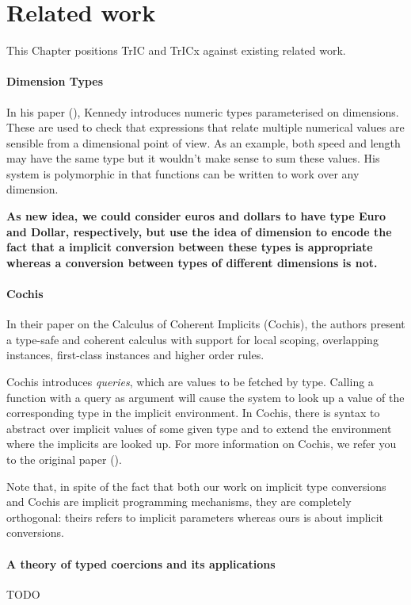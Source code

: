\chapter{Related work}
\label{cha:8}
This Chapter positions TrIC and TrICx against existing related work.
\subsubsection{Dimension Types}
In his paper (\cite{kennedy}), Kennedy introduces numeric types parameterised on dimensions. These are used to check that expressions that relate multiple numerical values are sensible from a dimensional point of view. As an example, both speed and length may have the same type but it wouldn't make sense to sum these values. His system is polymorphic in that functions can be written to work over any dimension.

\textbf{As new idea, we could consider euros and dollars to have type Euro and Dollar, respectively, but use the idea of dimension to encode the fact that a implicit conversion between these types is appropriate whereas a conversion between types of different dimensions is not.}
\subsubsection{Cochis}
In their paper on the Calculus of Coherent Implicits (Cochis), the authors present a type-safe and coherent calculus with support for local scoping, overlapping instances, first-class instances and higher order rules.

Cochis introduces \textit{queries}, which are values to be fetched by type. Calling a function with a query as argument will cause the system to look up a value of the corresponding type in the implicit environment. In Cochis, there is syntax to abstract over implicit values of some given type and to extend the environment where the implicits are looked up. For more information on Cochis, we refer you to the original paper (\cite{cochis}).

Note that, in spite of the fact that both our work on implicit type conversions and Cochis are implicit programming mechanisms, they are completely orthogonal: theirs refers to implicit parameters whereas ours is about implicit conversions.
\subsubsection{A theory of typed coercions and its applications}
TODO \cite{swamy}
